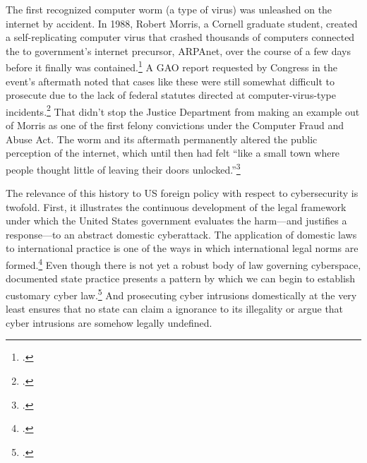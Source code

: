 \documentclass{memoir}
\begin{document}
\begin{refsegment}
The first recognized computer worm (a type of virus) was unleashed on the internet by accident. In 1988, Robert Morris, a Cornell graduate student, created a self-replicating computer virus that crashed thousands of computers connected the to government's internet precursor, ARPAnet, over the course of a few days before it finally was contained.\footcite[This source, a master's thesis for the USAF Air University, makes the dramatic and completely unsubstantiated claim that the Morris worm infected half of of ARPAnet's 88,000 computers. The more popular (and plausible) claim is that of the roughly 60,000 ARPAnet-connected computers, the worm infected 10\% of them, though that number is not particularly well substantiated either.]{moore_conception_2014} A GAO report requested by Congress in the event's aftermath noted that cases like these were still somewhat difficult to prosecute due to the lack of federal statutes directed at computer-virus-type incidents.\footcite{u._s._government_accounting_office_computer_1989} That didn't stop the Justice Department from making an example out of Morris as one of the first felony convictions under the Computer Fraud and Abuse Act. The worm and its aftermath permanently altered the public perception of the internet, which until then had felt ``like a small town where people thought little of leaving their doors unlocked.''\footcite{lee_how_2013}

The relevance of this history to US foreign policy with respect to cybersecurity is twofold. First, it illustrates the continuous development of the legal framework under which the United States government evaluates the harm---and justifies a response---to an abstract domestic cyberattack. The application of domestic laws to international practice is one of the ways in which international legal norms are formed.\footcite[p.~295]{deeks_international_2015}  Even though there is not yet a robust body of law governing cyberspace, documented state practice presents a pattern by which we can begin to establish customary cyber law.\footcite[p.~129]{brown_customary_2012} And prosecuting cyber intrusions domestically at the very least ensures that no state can claim a ignorance to its illegality or argue that cyber intrusions are somehow legally undefined.


\end{refsegment}
\end{document}
